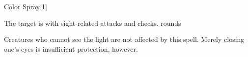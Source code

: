 \begin{spellsection}{Color Spray}[1]
    \begin{spellheader}
    \end{spellheader}
    \begin{spellcontent}
        \begin{spelltargetinginfo}
        \end{spelltargetinginfo}
        \begin{spelleffects}
            \spelleffect The target is \impaired with sight-related attacks and checks.
             rounds
        \end{spelleffects}
    \end{spellcontent}
    \begin{spellfooter}
        \spellnotes Creatures who cannot see the light are not affected by this spell. Merely closing one's eyes is insufficient protection, however.
        \miscastexplode
    \end{spellfooter}
    \begin{spellaugments}
    \end{spellaugments}
\end{spellsection}

